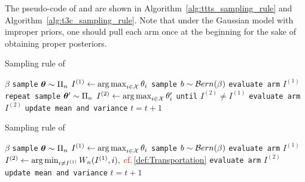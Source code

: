 The pseudo-code of \TTTS and \TCC are shown in Algorithm~\ref{alg:ttts_sampling_rule} and Algorithm~\ref{alg:t3c_sampling_rule}. Note that under the Gaussian model with improper priors, one should pull each arm once at the beginning for the sake of obtaining proper posteriors. 


\begin{algorithm}[ht]
\centering
\caption{Sampling rule of \TTTS}
\label{alg:ttts_sampling_rule}
\footnotesize
\begin{algorithmic}[1]
    $\beta$ %
        \State \texttt{sample} ${\boldsymbol \theta} \sim \Pi_n$
        \State $I^{(1)} \leftarrow \operatorname*{arg\,max}_{i\in\mathcal{X}}\theta_i$
	    \State \texttt{sample} $b \sim \mathcal{B} ern(\beta)$
	        \State \texttt{evaluate arm} $I^{(1)}$
	    \Else
	        \State \texttt{repeat sample} ${\boldsymbol \theta}' \sim \Pi_n$
            \State $I^{(2)} \leftarrow \operatorname*{arg\,max}_{i\in\mathcal{X}}\theta_i'$
	        \State \texttt{until} $I^{(2)} \neq I^{(1)}$
		    \State \texttt{evaluate arm} $I^{(2)}$
	    \EndIf
	    \State \texttt{update mean and variance}
	    \State $t = t+1$
   \EndFor
\end{algorithmic}
\end{algorithm}

\begin{algorithm}[ht]
\centering
\caption{Sampling rule of \textcolor{red}{\TCC}}
\label{alg:t3c_sampling_rule}
\footnotesize
\begin{algorithmic}[1]
    $\beta$ %
        \State \texttt{sample} ${\boldsymbol \theta} \sim \Pi_n$
        \State $I^{(1)} \leftarrow \operatorname*{arg\,max}_{i\in\mathcal{X}}\theta_i$
	    \State \texttt{sample} $b \sim \mathcal{B} ern(\beta)$
	        \State \texttt{evaluate arm} $I^{(1)}$
	    \Else
	        \State \textcolor{red}{$I^{(2)} \leftarrow \operatorname*{arg\,min}_{i\neq I^{(1)}}W_n(I^{(1)},i), $ cf.\,\eqref{def:Transportation}}
		    \State \texttt{evaluate arm} $I^{(2)}$
	    \EndIf
	    \State \texttt{update mean and variance}
	    \State $t = t+1$
   \EndFor
\end{algorithmic}
\end{algorithm}

